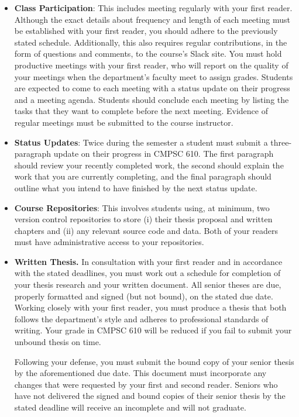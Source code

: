 \begin{itemize}
  \itemsep -.25em

  \item {\bf Class Participation}: This includes meeting regularly with your first reader. Although the exact details
    about frequency and length of each meeting must be established with your first reader, you should adhere to the
    previously stated schedule. Additionally, this also requires regular contributions, in the form of questions and
    comments, to the course's Slack site. You must hold productive meetings with your first reader, who will report on
    the quality of your meetings when the department's faculty meet to assign grades.  Students are expected to come to
    each meeting with a status update on their progress and a meeting agenda.  Students should conclude each meeting by
    listing the tasks that they want to complete before the next meeting. Evidence of regular meetings must be submitted
    to the course instructor.

  \item {\bf Status Updates}: Twice during the semester a student must submit a three-paragraph update on their progress
    in CMPSC 610. The first paragraph should review your recently completed work, the second should explain the work
    that you are currently completing, and the final paragraph should outline what you intend to have finished by the
    next status update.

  \item {\bf Course Repositories}: This involves students using, at minimum, two version control repositories to
    store (i) their thesis proposal and written chapters and (ii) any relevant source code and data.  Both of your
    readers must have administrative access to your repositories.

  \item {\bf Written Thesis.} In consultation with your first reader and in accordance with the stated deadlines, you
    must work out a schedule for completion of your thesis research and your written document. All senior theses are
    due, properly formatted and signed (but not bound), on the stated due date.  Working closely with your first reader,
    you must produce a thesis that both follows the department's style and adheres to professional standards of writing.
    Your grade in CMPSC 610 will be reduced if you fail to submit your unbound thesis on time.

    Following your defense, you must submit the bound copy of your senior thesis by the aforementioned due date.  This
    document must incorporate any changes that were requested by your first and second reader. Seniors who have not
    delivered the signed and bound copies of their senior thesis by the stated deadline will receive an
    incomplete and will not graduate.


\end{itemize}
